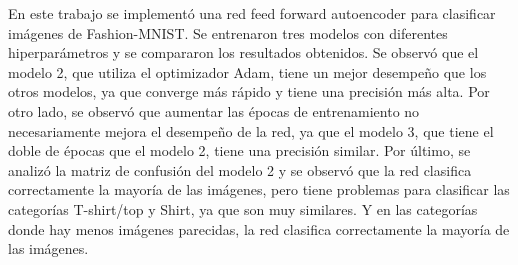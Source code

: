 \documentclass[aps,prl,reprint,groupedaddress]{revtex4-2}
\begin{document}
En este trabajo se implementó una red feed forward autoencoder para clasificar
imágenes de Fashion-MNIST. Se entrenaron tres modelos con diferentes 
hiperparámetros y se compararon los resultados obtenidos. Se observó que el 
modelo 2, que utiliza el optimizador Adam, tiene un mejor desempeño que los 
otros modelos, ya que converge más rápido y tiene una precisión más alta. Por 
otro lado, se observó que aumentar las épocas de entrenamiento no 
necesariamente mejora el desempeño de la red, ya que el modelo 3, que tiene 
el doble de épocas que el modelo 2, tiene una precisión similar. Por último, 
se analizó la matriz de confusión del modelo 2 y se observó que la red 
clasifica correctamente la mayoría de las imágenes, pero tiene problemas para 
clasificar las categorías T-shirt/top y Shirt, ya que son muy similares. Y en 
las categorías donde hay menos imágenes parecidas, la red clasifica 
correctamente la mayoría de las imágenes.




\end{document}

